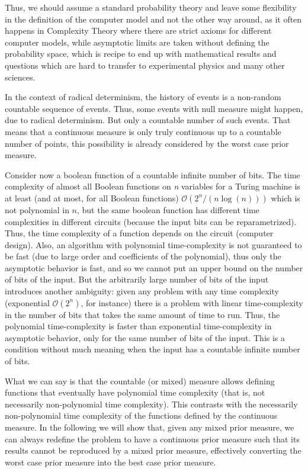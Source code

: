 \documentclass[11pt,a4paper]{report}
\begin{document}
Thus, we should assume a standard probability theory and leave some
flexibility in the definition of the computer model and not the other
way around, as it often happens in Complexity Theory where there are
strict axioms for different computer models, while asymptotic limits are
taken without defining the probability space, which is recipe to end up
with mathematical results and questions which are hard to transfer to
experimental physics and many other sciences.

In the context of radical determinism, the history of events is a
non-random countable sequence of events. Thus, some events with null
measure might happen, due to radical determinism. But only a countable
number of such events. That means that a continuous measure is only
truly continuous up to a countable number of points, this possibility is
already considered by the worst case prior measure.

Consider now a boolean function of a countable infinite number of bits.
The time complexity of almost all Boolean functions on \emph{n}
variables for a Turing machine is at least (and at most, for all Boolean
functions)
\(\mathcal{O}(2^n/(n\log(n)))\)\cite{shannon1949synthesis} \cite{10.1145/322123.322138} which is not polynomial in \(n\), but the same boolean
function has different time complexities in different
circuits\cite{shannon1949synthesis}
(because the input bits can be reparametrized). Thus, the time
complexity of a function depends on the circuit (computer design). Also,
an algorithm with polynomial time-complexity is not guaranteed to be
fast (due to large order and coefficients of the polynomial), thus only
the asymptotic behavior is fast, and so we cannot put an upper bound on
the number of bits of the input. But the arbitrarily large number of
bits of the input introduces another ambiguity: given any problem with
any time complexity (exponential \(\mathcal{O}(2^n)\), for instance)
there is a problem with linear time-complexity in the number of bits
that takes the same amount of time to run. Thus, the polynomial
time-complexity is faster than exponential time-complexity in asymptotic
behavior, only for the same number of bits of the input. This is a
condition without much meaning when the input has a countable infinite
number of bits.

What we can say is that the countable (or mixed) measure allows defining
functions that eventually have polynomial time complexity (that is, not
necessarily non-polynomial time complexity). This contrasts with the
necessarily non-polynomial time complexity of the functions defined by
the continuous measure. In the following we will show that, given any
mixed prior measure, we can always redefine the problem to have a
continuous prior measure such that its results cannot be reproduced by a
mixed prior measure, effectively converting the worst case prior measure
into the best case prior measure.
\end{document}
